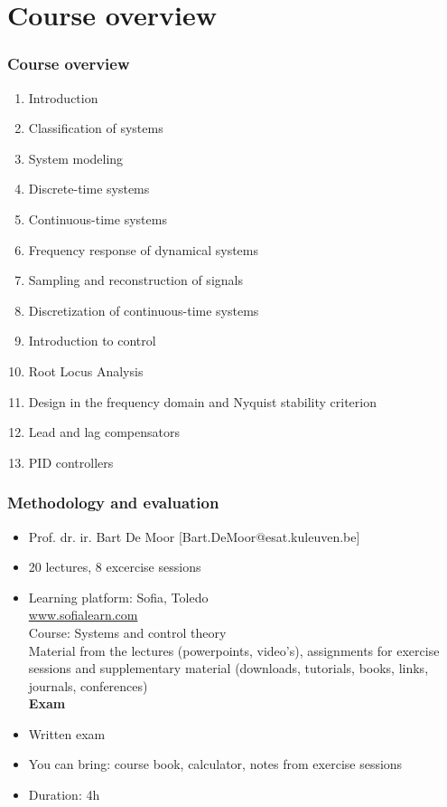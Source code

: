 \section{Course overview} 

\begin{frame}
	\frametitle{Course overview}
	\begin{enumerate}
		\item Introduction
		\item Classification of systems
		\item System modeling
		\item Discrete-time systems
		\item Continuous-time systems
		\item Frequency response of dynamical systems
		\item Sampling and reconstruction of signals
		\item Discretization of continuous-time systems
		\item Introduction to control
		\item Root Locus Analysis
		\item Design in the frequency domain and Nyquist stability criterion
		\item Lead and lag compensators
		\item PID controllers
	\end{enumerate}
\end{frame}

\begin{frame}
	\frametitle{Methodology and evaluation}
	\begin{itemize}
		\item Prof. dr. ir. Bart De Moor ‎[Bart.DeMoor@esat.kuleuven.be]‎
		\item 20 lectures, 8 excercise sessions\\
		\item Learning platform: Sofia, Toledo\\
		\url{www.sofialearn.com}\\
		Course: Systems and control theory\\
		Material from the lectures (powerpoints, video's), assignments for exercise sessions and supplementary material (downloads, tutorials, books, links, journals, conferences)\\
		\bigskip
		\textbf{Exam}
		\item Written exam
		\item You can bring: course book, calculator, notes from exercise sessions
		\item Duration: 4h
	\end{itemize}
\end{frame}


